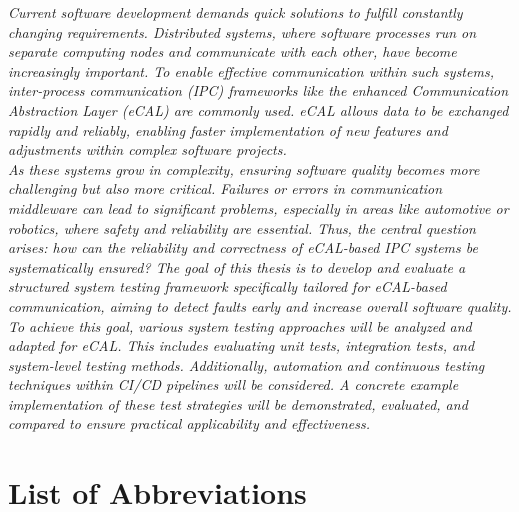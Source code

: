 \documentclass[a4paper,12pt,singlespacing]{article}
\begin{document}
\pagestyle{plain}
\pagebreak
\vspace*{2cm}
 \textit{Current software development demands quick solutions to fulfill constantly changing requirements. Distributed systems, where software processes run on separate computing nodes and communicate with each other, have become increasingly important. To enable effective communication within such systems, inter-process communication (IPC) frameworks like the enhanced Communication Abstraction Layer (eCAL) are commonly used. eCAL allows data to be exchanged rapidly and reliably, enabling faster implementation of new features and adjustments within complex software projects. } \\ 

 \textit{As these systems grow in complexity, ensuring software quality becomes more challenging but also more critical. Failures or errors in communication middleware can lead to significant problems, especially in areas like automotive or robotics, where safety and reliability are essential. Thus, the central question arises: how can the reliability and correctness of eCAL-based IPC systems be systematically ensured? The goal of this thesis is to develop and evaluate a structured system testing framework specifically tailored for eCAL-based communication, aiming to detect faults early and increase overall software quality. } \\ 

 \textit{To achieve this goal, various system testing approaches will be analyzed and adapted for eCAL. This includes evaluating unit tests, integration tests, and system-level testing methods. Additionally, automation and continuous testing techniques within CI/CD pipelines will be considered. A concrete example implementation of these test strategies will be demonstrated, evaluated, and compared to ensure practical applicability and effectiveness. }

\pagebreak
\tableofcontents
\pagebreak

\listoffigures
{}
{}
\pagebreak

\renewcommand{\lstlistlistingname}{List of Listings}
\lstlistoflistings
{}
{}
\pagebreak

\section*{List of Abbreviations}
{}
\end{document}
